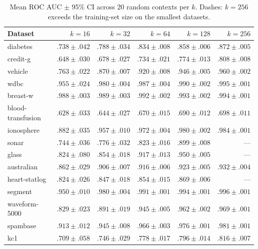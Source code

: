 \documentclass[11pt,a4paper]{article}
\begin{document}
\begin{table}[h]
\centering
\caption{Mean ROC AUC $\pm$ 95\% CI across 20 random contexts per $k$.
Dashes: $k{=}256$ exceeds the training-set size on the smallest datasets.}
\label{tab:stability}
\begin{tabular}{lrrrrr}
\toprule
Dataset & $k{=}16$ & $k{=}32$ & $k{=}64$ & $k{=}128$ & $k{=}256$ \\
\midrule
diabetes           & $.738{\pm}.042$ & $.788{\pm}.034$ & $.834{\pm}.008$ & $.858{\pm}.006$ & $.872{\pm}.005$ \\
credit-g           & $.648{\pm}.030$ & $.678{\pm}.027$ & $.734{\pm}.021$ & $.774{\pm}.013$ & $.808{\pm}.008$ \\
vehicle            & $.763{\pm}.022$ & $.870{\pm}.007$ & $.920{\pm}.008$ & $.946{\pm}.005$ & $.960{\pm}.002$ \\
wdbc               & $.955{\pm}.024$ & $.980{\pm}.004$ & $.987{\pm}.004$ & $.990{\pm}.002$ & $.995{\pm}.001$ \\
breast-w           & $.988{\pm}.003$ & $.989{\pm}.003$ & $.992{\pm}.002$ & $.993{\pm}.002$ & $.994{\pm}.001$ \\
blood-transfusion  & $.628{\pm}.033$ & $.644{\pm}.027$ & $.670{\pm}.015$ & $.690{\pm}.012$ & $.698{\pm}.011$ \\
ionosphere         & $.882{\pm}.035$ & $.957{\pm}.010$ & $.972{\pm}.004$ & $.980{\pm}.002$ & $.984{\pm}.001$ \\
sonar              & $.744{\pm}.036$ & $.776{\pm}.032$ & $.823{\pm}.016$ & $.899{\pm}.008$ & --- \\
glass              & $.824{\pm}.080$ & $.854{\pm}.018$ & $.917{\pm}.013$ & $.950{\pm}.005$ & --- \\
australian         & $.862{\pm}.029$ & $.906{\pm}.007$ & $.916{\pm}.006$ & $.923{\pm}.005$ & $.932{\pm}.004$ \\
heart-statlog      & $.824{\pm}.026$ & $.847{\pm}.018$ & $.854{\pm}.015$ & $.869{\pm}.006$ & --- \\
segment            & $.950{\pm}.010$ & $.980{\pm}.004$ & $.991{\pm}.001$ & $.994{\pm}.001$ & $.996{\pm}.001$ \\
waveform-5000      & $.829{\pm}.023$ & $.891{\pm}.019$ & $.945{\pm}.005$ & $.962{\pm}.002$ & $.969{\pm}.001$ \\
spambase           & $.913{\pm}.012$ & $.945{\pm}.008$ & $.966{\pm}.003$ & $.976{\pm}.001$ & $.981{\pm}.001$ \\
kc1                & $.709{\pm}.058$ & $.746{\pm}.029$ & $.778{\pm}.017$ & $.796{\pm}.014$ & $.816{\pm}.007$ \\
\bottomrule
\end{tabular}
\end{table}
\end{document}
